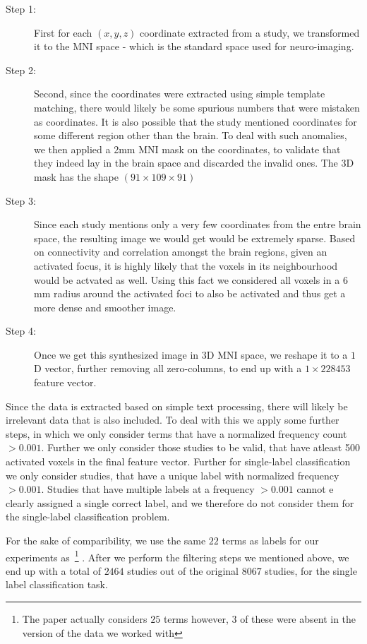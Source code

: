 \documentclass{article} %
\begin{document}
\begin{description}
\item[Step 1: ] First for each $(x, y, z)$ coordinate extracted from a study, we transformed it to the MNI space - which is the standard space used for neuro-imaging. 
\item[Step 2: ] Second, since the coordinates were extracted using simple template matching, there would likely be some spurious numbers that were mistaken as coordinates. It is also possible that the study mentioned coordinates for some different region other than the brain. To deal with such anomalies, we then applied a 2mm MNI mask on the coordinates, to validate that they indeed lay in the brain space and discarded the invalid ones. The 3D mask has the shape $(91 \times 109 \times 91)$ 
\item[Step 3: ] Since each study mentions only a very few coordinates from the entre brain space, the resulting image we would get would be extremely sparse. Based on connectivity and correlation amongst the brain regions, given an activated focus, it is highly likely that the voxels in its neighbourhood would be actvated as well. Using this fact we considered all voxels in a $6$ mm radius around the activated foci to also be activated and thus get a more dense and smoother image.
\item[Step 4: ] Once we get this synthesized image in $3$D MNI space, we reshape it to a $1$D vector, further removing all zero-columns, to end up with a $1 \times 228453$ feature vector.  
\end{description}

Since the data is extracted based on simple text processing, there will likely be irrelevant data that is also included. To deal with this we apply some further steps, in which we only consider terms that have a normalized frequency count $ > 0.001$. Further we only consider those studies to be valid, that have atleast 500 activated voxels in the final feature vector. Further for single-label classification we only consider studies, that have a unique label with normalized frequency  $ > 0.001$. Studies that have multiple labels at a frequency $ > 0.001$ cannot e clearly assigned a single correct label, and we therefore do not consider them for the single-label classification problem.

For the sake of comparibility, we use the same $22$ terms as labels for our experiments as~\cite{yarkoni2011large}\footnote{The paper actually considers $25$ terms however, $3$ of these were absent in the version of the data we worked with} . After we perform the filtering steps we mentioned above, we end up with a total of $2464$ studies out of the original $8067$ studies, for the single label classification task.
\end{document}
